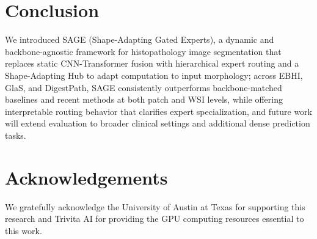 \section{Conclusion}
\label{sec:conclusion}
We introduced SAGE (Shape-Adapting Gated Experts), a dynamic and backbone-agnostic framework for histopathology image segmentation that replaces static CNN-Transformer fusion with hierarchical expert routing and a Shape-Adapting Hub to adapt computation to input morphology; across EBHI, GlaS, and DigestPath, SAGE consistently outperforms backbone-matched baselines and recent methods at both patch and WSI levels, while offering interpretable routing behavior that clarifies expert specialization, and future work will extend evaluation to broader clinical settings and additional dense prediction tasks.

\section*{Acknowledgements}
We gratefully acknowledge the University of Austin at Texas for supporting this research and Trivita AI for providing the GPU computing resources essential to this work.